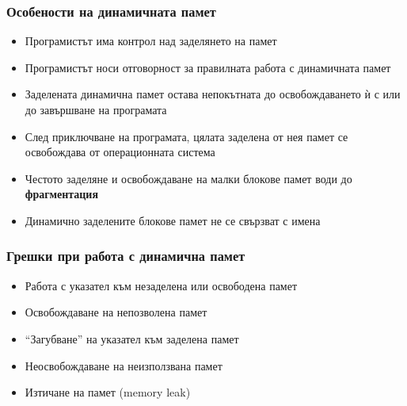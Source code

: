 \documentclass[alsotrans]{beamerswitch}
\begin{document}
\begin{frame}
  \frametitle{Особености на динамичната памет}

  \begin{itemize}[<+->]
  \item Програмистът има контрол над заделянето на памет
  \item Програмистът носи отговорност за правилната работа с динамичната памет
  \item Заделената динамична памет остава непокътната до освобождаването ѝ с  или до завършване на програмата
  \item След приключване на програмата, цялата заделена от нея памет се освобождава от операционната система
  \item Честото заделяне и освобождаване на малки блокове памет води до \textbf{фрагментация}
    \begin{center}
      \small
    \end{center}
  \item Динамично заделените блокове памет не се свързват с имена
  \end{itemize}
\end{frame}

\begin{frame}
  \frametitle{Грешки при работа с динамична памет}

  \begin{itemize}[<+->]
  \item Работа с указател към незаделена или освободена памет
  \item Освобождаване на непозволена памет
  \item ``Загубване'' на указател към заделена памет
  \item Неосвобождаване на неизползвана памет
  \item Изтичане на памет (memory leak)
  \end{itemize}
\end{frame}
\end{document}
